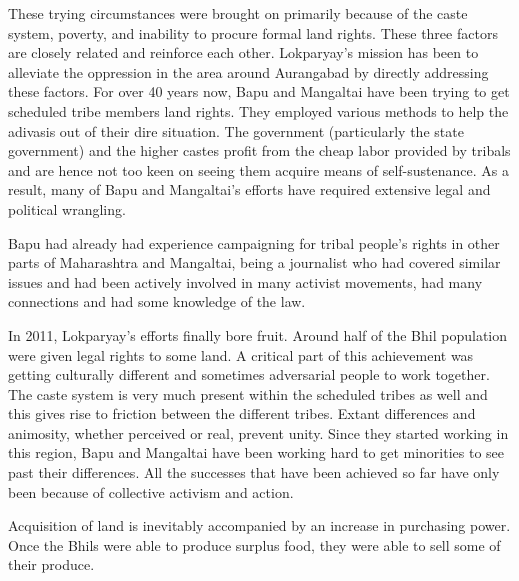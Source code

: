 \documentclass[report.tex]{subfiles}
\begin{document}
These trying circumstances were brought on primarily because of the caste system, poverty, and inability to procure formal land rights. These three factors are closely related and reinforce each other. Lokparyay's mission has been to alleviate the oppression in the area around Aurangabad by directly addressing these factors. For over 40 years now, Bapu and Mangaltai have been trying to get scheduled tribe members land rights. They employed various methods to help the adivasis out of their dire situation. The government (particularly the state government) and the higher castes profit from the cheap labor provided by tribals and are hence not too keen on seeing them acquire means of self-sustenance. As a result, many of Bapu and Mangaltai's efforts have required extensive legal and political wrangling.

Bapu had already had experience campaigning for tribal people's rights in other parts of Maharashtra and Mangaltai, being a journalist who had covered similar issues and had been actively involved in many activist movements, had many connections and had some knowledge of the law.

In 2011, Lokparyay's efforts finally bore fruit. Around half of the Bhil population were given legal rights to some land. A critical part of this achievement was getting culturally different and sometimes adversarial people to work together. The caste system is very much present within the scheduled tribes as well and this gives rise to friction between the different tribes. Extant differences and animosity, whether perceived or real, prevent unity. Since they started working in this region, Bapu and Mangaltai have been working hard to get minorities to see past their differences. All the successes that have been achieved so far have only been because of collective activism and action.

Acquisition of land is inevitably accompanied by an increase in purchasing power. Once the Bhils were able to produce surplus food, they were able to sell some of their produce. 
\end{document}
